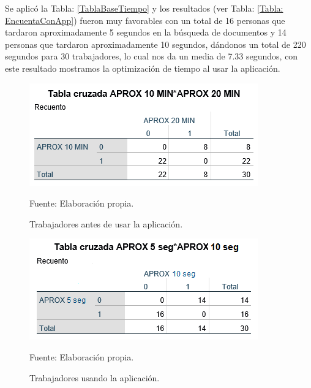 
Se aplicó la Tabla: \ref{TablaBaseTiempo} y los resultados (ver Tabla: \ref{Tabla: EncuentaConApp}) fueron muy favorables con un total de 16 personas que tardaron aproximadamente 5 segundos en la búsqueda de documentos y 14 personas que tardaron aproximadamente 10 segundos, dándonos un total de 220 segundos para 30 trabajadores, lo cual nos da un media de 7.33 segundos, con este resultado mostramos la optimización de tiempo al usar la aplicación.

\begin{figure}[h!]
	\centering
		\includegraphics[scale=0.7]{imagenes/matricrua10min20min.png}
		\caption{Trabajadores antes de usar la aplicación.}
		\begin{center}
    Fuente: Elaboración propia.
    \end{center}
	\label{fig:matricrua10min20min}
\end{figure}

\begin{figure}[h!]
	\centering
		\includegraphics[scale=0.7]{imagenes/matricrua2seg5seg.png}
		\caption{Trabajadores usando la aplicación.}
		\begin{center}
    Fuente: Elaboración propia.
    \end{center}
	\label{fig:matricrua2seg5seg}
\end{figure}

